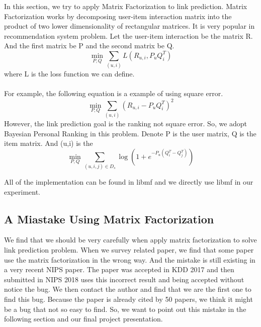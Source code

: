 \documentclass[12pt]{article}
\begin{document}
In this section, we try to apply Matrix Factorization to link prediction. Matrix Factorization works by decomposing user-item interaction matrix into the product of two lower dimensionality of rectangular matrices. It is very popular in recommendation system problem. Let the user-item interaction be the matrix R. And the first matrix be P and the second matrix be Q.  
\\
\begin{equation}
\min_{P,Q}{\sum_{(u,i)}{L(R_{u,i}, P_uQ_i^T)}}
\end{equation}
where L is the loss function we can define. \\
\\
For example, the following equation is a example of using square error. \\
\begin{equation}
\min_{P,Q}{\sum_{(u,i)}{(R_{u,i}-P_uQ_i^T)^2}}
\end{equation}
However, the link prediction goal is the ranking not square error. So, we adopt Bayesian Personal Ranking\cite{bpr} in this problem. Denote P is the user matrix, Q is the item matrix. And (u,i) is the 
\begin{equation}
\min_{P,Q} \sum_{(u,i,j)\in D_s}\log(1+e^{-P_u(Q_i^T - Q_j^T)})
\end{equation}

All of the implementation can be found in libmf\cite{libmf} and we directly use libmf in our experiment.

\subsection{A Miastake Using Matrix Factorization}
We find that we should be very carefully when apply matrix factorization to solve link prediction problem.
When we survey related paper, we find that some paper use the matrix factorization in the wrong way. And the mistake is still existing in a very recent NIPS paper. The paper was accepted in KDD 2017 and then submitted in NIPS 2018 uses this incorrect result and being accepted without notice the bug. We then contact the author and  find that we are the first one to find this bug. Because the paper is already cited by 50 papers, we think it might be a bug that not so easy to find. So, we want to point out this mistake in the following section and our final project presentation.   
\end{document}
